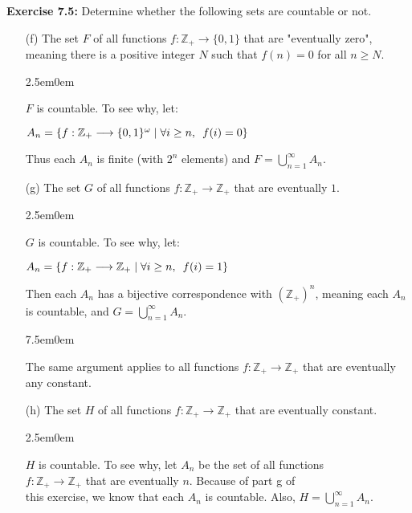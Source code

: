 \documentclass{book}
\newcommand{\myComment}{%
   \color{RawerSienna}%
   \fontsize{12}{14}\selectfont%
}
\newcommand{\exTwo}{%
\color{Purple}%
   \fontsize{13}{15}\selectfont%
}
\newenvironment{myIndent}{%
   \begin{adjustwidth}{2.5em}{0em}%
}{%
   \end{adjustwidth}%
}
\newenvironment{myTindent}{%
   \begin{adjustwidth}{7.5em}{0em}%
}{%
   \end{adjustwidth}%
}
\newcommand{\blab}[1]{\textbf{#1}}
\newcommand{\myHS}{ \hspace{0.5em}}
\newcommand{\retTwo}{\hfill\bigbreak}
\begin{document}
   \blab{Exercise 7.5:} Determine whether the following sets are countable or not.
   \begin{itemize}
      \item[(f)] The set $F$ of all functions $f: \mathbb{Z}_+ \longrightarrow \{0, 1\}$ that are "eventually zero", meaning there is a positive integer $N$ such that $f(n) = 0$ for all $n \geq N$.
      
      \begin{myIndent}\exTwo
         $F$ is countable. To see why, let:
         
         {\centering $A_n = \{f: \mathbb{Z}_+ \longrightarrow \{0, 1\}^\omega \mid \forall i \geq n, \myHS f(i) = 0\}$\retTwo\par}
         
         Thus each $A_n$ is finite (with $2^n$ elements) and $F = \bigcup\limits_{n = 1}^\infty A_n$.\newpage
      \end{myIndent}

      \item[(g)] The set $G$ of all functions $f: \mathbb{Z}_+ \longrightarrow \mathbb{Z}_+$ that are eventually $1$.
      
      \begin{myIndent}\exTwo
         $G$ is countable. To see why, let:

         {\centering $A_n = \{f: \mathbb{Z}_+ \longrightarrow \mathbb{Z}_+ \mid \forall i \geq n, \myHS f(i) = 1\}$\retTwo\par}

         Then each $A_n$ has a bijective correspondence with $(\mathbb{Z}_+)^n$, meaning each $A_n$ is countable, and $G = \bigcup\limits_{n = 1}^\infty A_n$.
         
         \begin{myTindent}\myComment
            The same argument applies to all functions $f: \mathbb{Z}_+ \longrightarrow \mathbb{Z}_+$ that are eventually any constant.\retTwo
         \end{myTindent}
      \end{myIndent}

      \item[(h)] The set $H$ of all functions $f: \mathbb{Z}_+ \longrightarrow \mathbb{Z}_+$ that are eventually constant.
      
      \begin{myIndent}\exTwo
         $H$ is countable. To see why, let $A_n$ be the set of all functions\\ $f: \mathbb{Z}_+ \longrightarrow \mathbb{Z}_+$ that are eventually $n$. Because of part g of\\ [-6pt] this exercise, we know that each $A_n$ is countable. Also, $H = \bigcup\limits_{n = 1}^\infty A_n$.\retTwo
      \end{myIndent}


\end{itemize}
\end{document}

